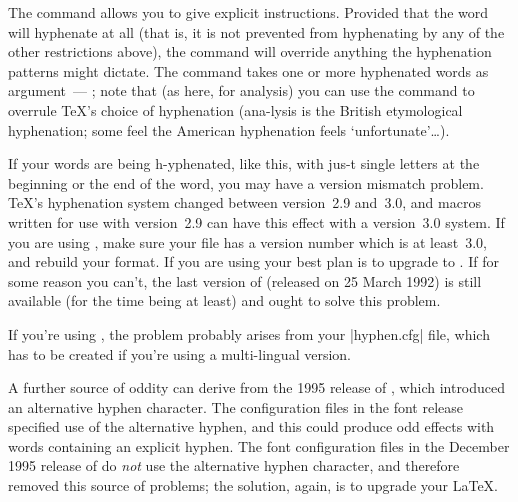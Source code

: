 The  command allows you to give explicit instructions.
Provided that the word will hyphenate at all (that is, it is not
prevented from hyphenating by any of the other restrictions above),
the command will override anything the hyphenation patterns might
dictate.  The command takes one or more hyphenated words as
argument~--- ; note that
(as here, for analysis) you can use the command to overrule \TeX{}'s
choice of hyphenation (ana-lysis is the British etymological
hyphenation; some feel the American hyphenation feels
`unfortunate'\dots{}).
\begin{ctanrefs}
\item[hyphenat.sty]
\end{ctanrefs}


If your words are being h-yphenated, like this, with jus-t single
letters at the 
beginning or the end of the word, you may have a version mismatch
problem. \TeX{}'s hyphenation system changed between version~2.9
and~3.0, and macros written for use with version~2.9 can have this
effect with a version~3.0 system.  If you are using \plaintex{}, make
sure your  file has a version number which is at
least~3.0, and rebuild your format.  If you are using \LaTeXo{} your
best plan is to upgrade to \LaTeXe{}.  If for some reason you can't,
the last version of \LaTeXo{} (released on 25 March 1992) is still
available (for the time being at least) and ought to solve this
problem.

If you're using \LaTeXe{}, the problem probably arises from your
|hyphen.cfg| file, which has to be created if you're using a
multi-lingual version.

A further source of oddity can derive from the 1995 release of
,
which introduced an alternative hyphen character.  The \LaTeXe{}
configuration files in the font release specified use of the
alternative hyphen, and this could produce odd effects with words
containing an explicit hyphen.  The font configuration files in the
December 1995 release of \LaTeXe{} do \emph{not} use the alternative
hyphen character, and therefore removed this source of problems; the
solution, again, is to upgrade your \LaTeX{}.
\begin{ctanrefs}
\item[\nothtml{\rmfamily}\LaTeXo{}]
\item[plain.tex]
\end{ctanrefs}

